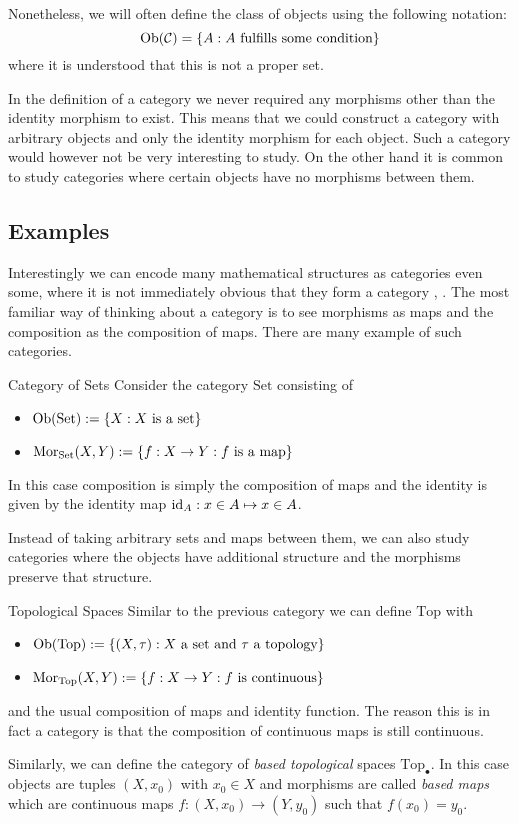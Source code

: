 Nonetheless, we will often define the class of objects using the following notation:
$$
\mathrm {Ob}(\mathcal{C}) = \{A: \text{$A$ fulfills some condition}\}
$$
where it is understood that this is not a proper set.


In the definition of a category we never required any morphisms other than the identity morphism to exist.
This means that we could construct a category with arbitrary objects and only the identity morphism for each object. 
Such a category would however not be very interesting to study.
On the other hand it is common to study categories where certain objects have no morphisms between them.

\subsection{Examples}

Interestingly we can encode many mathematical structures as categories even some, where it is not immediately obvious that they form a category \cite[Chap.~1~Ex.~1-7]{Roman2017}, \cite[Sec.~1.1]{Leinster2014-dc}.
The most familiar way of thinking about a category is to see morphisms as maps and the composition as the composition of maps. There are many example of such categories.

\begin{example}{Category of Sets}{}
Consider the category $\mathrm{Set}$ consisting of
\begin{itemize}
    \item $\mathrm {Ob}(\mathrm{Set}) := \{X: \text{$X$ is a set}\}$
    \item $\mathrm {Mor}_{\mathrm{Set}}(X,Y) := \{f: X \to Y: \text{$f$ is a map}\}$
\end{itemize}
In this case composition is simply the composition of maps and the identity is given by the identity map $\mathrm{id}_A: x \in A \mapsto x \in A$.
\end{example}

Instead of taking arbitrary sets and maps between them, we can also study categories where the objects have additional structure and the morphisms preserve that structure.

\begin{example}{Topological Spaces}{}
Similar to the previous category we can define $\mathrm{Top}$ with
\begin{itemize}
    \item $\mathrm {Ob}(\mathrm{Top}) := \{(X,\tau) : \text{$X$ a set and $\tau$ a topology}\}$
    \item $\mathrm {Mor}_{\mathrm{Top}}(X,Y) := \{f: X \to Y: \text{$f$ is continuous}\}$
\end{itemize}
and the usual composition of maps and identity function. The reason this is in fact a category is that the composition of continuous maps is still continuous.

Similarly, we can define the category of \emph{based topological} spaces $\mathrm{Top}_\bullet$. In this case objects are tuples $(X,x_0)$ with $x_0 \in X$ and morphisms are called \emph{based maps} which are continuous maps $f: (X,x_0) \to (Y,y_0)$ such that $f(x_0) = y_0$.
\end{example}

